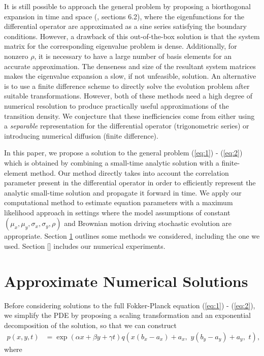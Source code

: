 \documentclass[10pt]{article}
\begin{document}
It is still possible to approach the general problem by proposing a
biorthogonal expansion in time and space
(\cite{risken1989fokker-planck}, sections 6.2), where the
eigenfunctions for the differential operator are approximated as a
sine series satisfying the boundary conditions. However, a drawback of
this out-of-the-box solution is that the system matrix for the
corresponding eigenvalue problem is dense. Additionally, for nonzero
$\rho$, it is necessary to have a large number of basis elements for
an accurate approximation. The denseness and size of the resultant
system matrices makes the eigenvalue expansion a slow, if not
unfeasible, solution. An alternative is to use a finite difference
scheme to directly solve the evolution problem after suitable
transformations. However, both of these methods need a high degree of
numerical resolution to produce practically useful approximations of
the transition density. We conjecture that these inefficiencies come
from either using a \textit{separable} representation for the
differential operator (trigonometric series) or introducing numerical
diffusion (finite difference).

In this paper, we propose a solution to the general problem
(\ref{eq:1}) - (\ref{eq:2}) which is obtained by combining a
small-time analytic solution with a finite-element method. Our method
directly takes into account the correlation parameter present in the
differential operator in order to efficiently represent the analytic
small-time solution and propagate it forward in time. We apply our
computational method to estimate equation parameters with a maximum
likelihood approach in settings where the model assumptions of
constant $(\mu_x, \mu_y, \sigma_x, \sigma_y, \rho)$ and Brownian
motion driving stochastic evolution are appropriate. Section
\ref{sec:approximate-sols} outlines some methods we considered,
including the one we used. Section [] includes our numerical
experiments.


\section{Approximate Numerical Solutions} \label{sec:approximate-sols}
Before considering solutions to the full Fokker-Planck equation
(\ref{eq:1}) - (\ref{eq:2}), we simplify the PDE by proposing a
scaling transformation and an exponential decomposition of the
solution, so that we can construct
\begin{align}
  p(x,y,t) &= \exp(\alpha x + \beta y + \gamma t) q\left( x(b_x - a_x) + a_x, \,\, y(b_y - a_y) + a_y, \,\, t \right), \label{eq:q-to-p}
\end{align}
where
\end{document}

